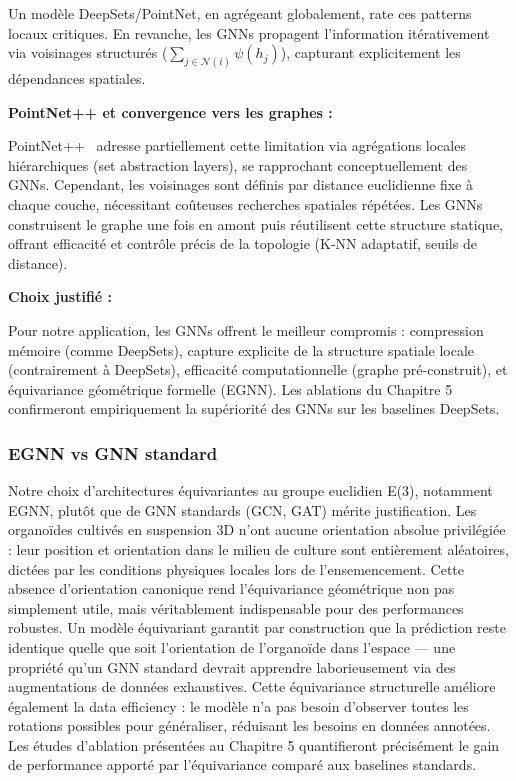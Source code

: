 Un modèle DeepSets/PointNet, en agrégeant globalement, rate ces patterns locaux critiques. En revanche, les GNNs propagent l'information itérativement via voisinages structurés ($\sum_{j \in \mathcal{N}(i)} \psi(h_j)$), capturant explicitement les dépendances spatiales.

\textbf{PointNet++ et convergence vers les graphes :}

PointNet++~\cite{Qi2017b} adresse partiellement cette limitation via agrégations locales hiérarchiques (set abstraction layers), se rapprochant conceptuellement des GNNs. Cependant, les voisinages sont définis par distance euclidienne fixe à chaque couche, nécessitant coûteuses recherches spatiales répétées. Les GNNs construisent le graphe une fois en amont puis réutilisent cette structure statique, offrant efficacité et contrôle précis de la topologie (K-NN adaptatif, seuils de distance).

\textbf{Choix justifié :}

Pour notre application, les GNNs offrent le meilleur compromis : compression mémoire (comme DeepSets), capture explicite de la structure spatiale locale (contrairement à DeepSets), efficacité computationnelle (graphe pré-construit), et équivariance géométrique formelle (EGNN). Les ablations du Chapitre 5 confirmeront empiriquement la supériorité des GNNs sur les baselines DeepSets.

\subsubsection{EGNN vs GNN standard}

Notre choix d'architectures équivariantes au groupe euclidien E(3), notamment EGNN, plutôt que de GNN standards (GCN, GAT) mérite justification. Les organoïdes cultivés en suspension 3D n'ont aucune orientation absolue privilégiée : leur position et orientation dans le milieu de culture sont entièrement aléatoires, dictées par les conditions physiques locales lors de l'ensemencement. Cette absence d'orientation canonique rend l'équivariance géométrique non pas simplement utile, mais véritablement indispensable pour des performances robustes. Un modèle équivariant garantit par construction que la prédiction reste identique quelle que soit l'orientation de l'organoïde dans l'espace — une propriété qu'un GNN standard devrait apprendre laborieusement via des augmentations de données exhaustives. Cette équivariance structurelle améliore également la data efficiency : le modèle n'a pas besoin d'observer toutes les rotations possibles pour généraliser, réduisant les besoins en données annotées. Les études d'ablation présentées au Chapitre 5 quantifieront précisément le gain de performance apporté par l'équivariance comparé aux baselines standards.

